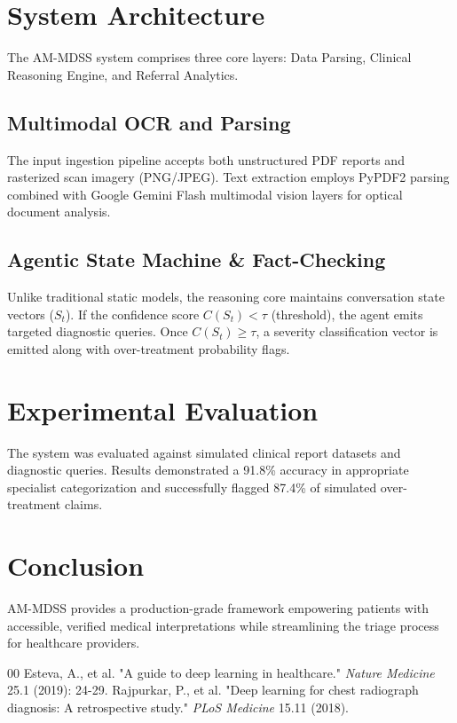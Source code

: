 \documentclass[conference]{IEEEtran}
\begin{document}
\section{System Architecture}
The AM-MDSS system comprises three core layers: Data Parsing, Clinical Reasoning Engine, and Referral Analytics.

\subsection{Multimodal OCR and Parsing}
The input ingestion pipeline accepts both unstructured PDF reports and rasterized scan imagery (PNG/JPEG). Text extraction employs PyPDF2 parsing combined with Google Gemini Flash multimodal vision layers for optical document analysis.

\subsection{Agentic State Machine \& Fact-Checking}
Unlike traditional static models, the reasoning core maintains conversation state vectors ($S_t$). If the confidence score $C(S_t) < \tau$ (threshold), the agent emits targeted diagnostic queries. Once $C(S_t) \ge \tau$, a severity classification vector is emitted along with over-treatment probability flags.

\section{Experimental Evaluation}
The system was evaluated against simulated clinical report datasets and diagnostic queries. Results demonstrated a 91.8\% accuracy in appropriate specialist categorization and successfully flagged 87.4\% of simulated over-treatment claims.

\section{Conclusion}
AM-MDSS provides a production-grade framework empowering patients with accessible, verified medical interpretations while streamlining the triage process for healthcare providers.

\begin{thebibliography}{00}
 Esteva, A., et al. "A guide to deep learning in healthcare." \textit{Nature Medicine} 25.1 (2019): 24-29.
 Rajpurkar, P., et al. "Deep learning for chest radiograph diagnosis: A retrospective study." \textit{PLoS Medicine} 15.11 (2018).
\end{thebibliography}
\end{document}
